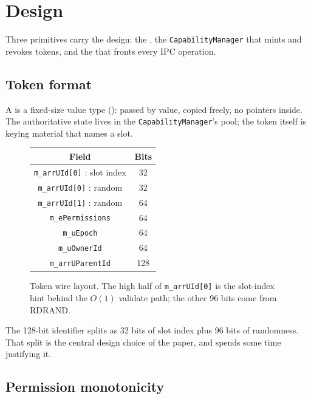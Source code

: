 \section{Design}
\label{sec:design}

Three primitives carry the design: the \captoken, the
\texttt{CapabilityManager} that mints and revokes tokens, and the
\capgate that fronts every IPC operation.

\subsection{Token format}
\label{sec:design:token}

A \captoken is a fixed-size value type (): passed by
value, copied freely, no pointers inside. The authoritative state
lives in the \texttt{CapabilityManager}'s pool; the token itself is
keying material that names a slot.

\begin{figure}[t]
\centering\small
\begin{tabular}{|c|c|}
\hline
\textbf{Field} & \textbf{Bits} \\
\hline
\texttt{m\_arrUId[0]} : slot index   & 32 \\
\texttt{m\_arrUId[0]} : random       & 32 \\
\texttt{m\_arrUId[1]} : random       & 64 \\
\texttt{m\_ePermissions}             & 64 \\
\texttt{m\_uEpoch}                   & 64 \\
\texttt{m\_uOwnerId}                 & 64 \\
\texttt{m\_arrUParentId}             & 128 \\
\hline
\end{tabular}
\caption{Token wire layout. The high half of \texttt{m\_arrUId[0]}
is the slot-index hint behind the $O(1)$ validate path; the other 96
bits come from RDRAND.}
\label{fig:token}
\end{figure}

The 128-bit identifier splits as 32 bits of slot index plus 96 bits
of randomness. That split is the central design choice of the paper,
and  spends some time justifying it.

\subsection{Permission monotonicity}
\label{sec:design:mono}

